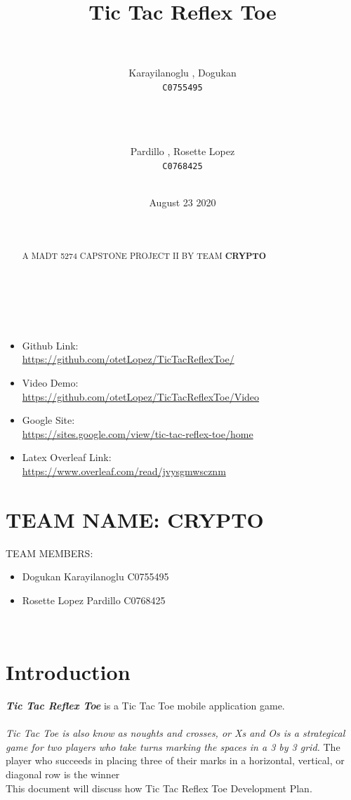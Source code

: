 \documentclass{article}
\title{Tic Tac Reflex Toe}
\author{
  \\\\ 
  Karayilanoglu , Dogukan \\ \texttt{C0755495}\\\\
  \and
  \\\\Pardillo , Rosette Lopez \\ \texttt{C0768425}\\\\\newline
}
\date{August 23 2020}
\begin{document}
\maketitle
~\\
~\newline
\begin{itemize}
    \item Github Link:\\ \url{https://github.com/otetLopez/TicTacReflexToe/}
    \item Video Demo:\\
    \url{https://github.com/otetLopez/TicTacReflexToe/Video}
    \item Google Site:\\
    \url{https://sites.google.com/view/tic-tac-reflex-toe/home}
    \item Latex Overleaf Link:\\
    \url{https://www.overleaf.com/read/jvysgmwscznm}
\end{itemize}
\newpage

\begin{abstract}
\centering
~\\
~\\
A MADT 5274 CAPSTONE PROJECT II BY TEAM \textbf{CRYPTO}
\end{abstract}
\newpage

\tableofcontents
\newpage

\listoffigures
\newpage





\section{TEAM NAME: CRYPTO}
TEAM MEMBERS:
\begin{itemize}
    \item Dogukan Karayilanoglu C0755495
    \item Rosette Lopez Pardillo C0768425
\end{itemize}
~\newline
\section{Introduction}
    \textbf{\emph{Tic Tac Reflex Toe}} is a Tic Tac Toe mobile application game.
    \\\\
    \textit{Tic Tac Toe \emph{is also know as noughts and crosses, or Xs and Os is a strategical game for two players who take turns marking the spaces in a 3 by 3 grid.}}
    The player who succeeds in placing three of their marks in a horizontal, vertical, or diagonal row is the winner
    \\
    This document will discuss how Tic Tac Reflex Toe Development Plan.  
    
\end{document}
